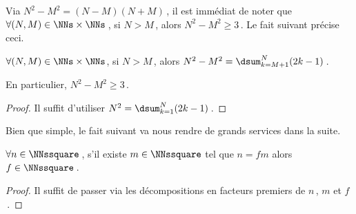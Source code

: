 Via $N^2 - M^2 = (N - M)(N + M)$\,, il est immédiat de noter que 
$\forall (N, M) \in \NNs \times \NNs$\,, si $N > M$\,, alors $N^2 - M^2 \geq 3$\,. Le fait suivant précise ceci.


\begin{fact} \label{dist-square}
	$\forall (N, M) \in \NNs \times \NNs$, 
	si $N > M$\,, alors $N^2 - M^2 = \dsum_{k=M+1}^{N} (2 k - 1)$\,.
	
	En particulier, $N^2 - M^2 \geq 3$\,.
\end{fact}


\begin{proof}
	Il suffit d'utiliser $N^2 = \dsum_{k=1}^{N} (2 k - 1)$\,.
\end{proof}




Bien que simple, le fait suivant va nous rendre de grands services dans la suite.


\begin{fact} \label{facto-square}
	$\forall n \in \NNssquare$\,, s'il existe $m \in \NNssquare$ tel que $n =  f m$ alors $f  \in \NNssquare$\,.
\end{fact}


\begin{proof}
	Il suffit de passer via les décompositions en facteurs premiers de $n$\,, $m$ et $f$\,.
\end{proof}
